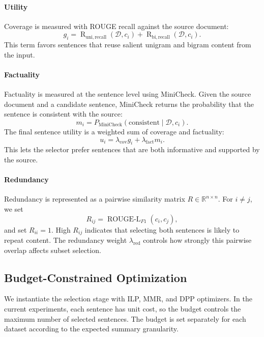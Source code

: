 \documentclass[11pt]{article}
\begin{document}
\paragraph{Utility}
Coverage is measured with ROUGE recall against the source document:
\begin{equation}
g_i =
\operatorname{R}_{\mathrm{uni,recall}}(\mathcal{D}, c_i)
+
\operatorname{R}_{\mathrm{bi,recall}}(\mathcal{D}, c_i).
\end{equation}
This term favors sentences that reuse salient unigram and bigram content from the input.

\paragraph{Factuality}
Factuality is measured at the sentence level using MiniCheck. Given the source document and a candidate sentence, MiniCheck returns the probability that the sentence is consistent with the source:
\begin{equation}
m_i = P_{\mathrm{MiniCheck}}(\mathrm{consistent}\mid \mathcal{D}, c_i).
\end{equation}
The final sentence utility is a weighted sum of coverage and factuality:
\begin{equation}
u_i = \lambda_{\mathrm{cov}}g_i
    + \lambda_{\mathrm{fact}}m_i .
\end{equation}
This lets the selector prefer sentences that are both informative and supported by the source.

\paragraph{Redundancy}
Redundancy is represented as a pairwise similarity matrix $R\in\mathbb{R}^{n\times n}$. For $i\ne j$, we set
\begin{equation}
R_{ij} = \operatorname{ROUGE\mbox{-}L}_{F1}(c_i,c_j),
\end{equation}
and set $R_{ii}=1$. High $R_{ij}$ indicates that selecting both sentences is likely to repeat content. The redundancy weight $\lambda_{\mathrm{red}}$ controls how strongly this pairwise overlap affects subset selection.

\subsection{Budget-Constrained Optimization}

We instantiate the selection stage with ILP, MMR, and DPP optimizers. In the current experiments, each sentence has unit cost, so the budget controls the maximum number of selected sentences. The budget is set separately for each dataset according to the expected summary granularity.
\end{document}
